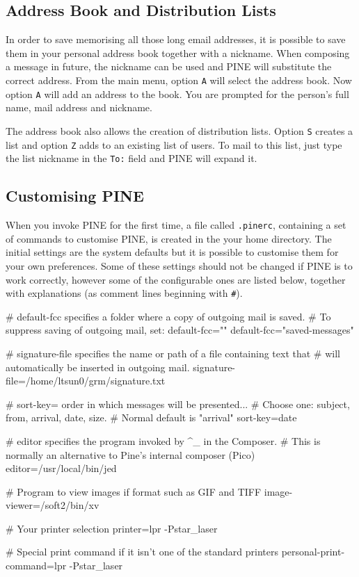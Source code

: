 \documentclass[11pt,nolof]{starlink}
\begin{document}
\subsection{Address Book and Distribution Lists}

In order to save memorising all those long email addresses, it is
possible to save them in your personal address book together with a
nickname.  When composing a message in future, the nickname can be used
and PINE will substitute the correct address. From the main menu,
option \texttt{A} will select the address book. Now option \texttt{A} will
add an address to the book. You are prompted for the person's full
name, mail address and nickname.

The address book also allows the creation of distribution lists.
Option \texttt{S} creates a list and option \texttt{Z} adds to an existing
list of users. To mail to this list, just type the list nickname in the
\texttt{To:} field and PINE will expand it.

\subsection{Customising PINE}
\label{sec-cust}

When you invoke PINE for the first time, a file called \texttt{.pinerc},
containing a set of commands to customise PINE, is created in the your
home directory. The initial settings are the system defaults but it is
possible to customise them for your own preferences.  Some of these
settings should not be changed if PINE is to work correctly, however
some of the configurable ones are listed below, together with
explanations (as comment lines beginning with \texttt{\#}).

\begin{small}
\begin{terminalv}
# default-fcc specifies a folder where a copy of outgoing mail is saved.
# To suppress saving of outgoing mail, set: default-fcc=""
default-fcc="saved-messages"

# signature-file specifies the name or path of a file containing text that
# will automatically be inserted in outgoing mail.
signature-file=/home/ltsun0/grm/signature.txt

# sort-key= order in which messages will be presented...
# Choose one: subject, from, arrival, date, size.
# Normal default is "arrival"
sort-key=date

# editor specifies the program invoked by ^_ in the Composer.
# This is normally an alternative to Pine's internal composer (Pico)
editor=/usr/local/bin/jed

# Program to view images if format such as GIF and TIFF
image-viewer=/soft2/bin/xv

# Your printer selection
printer=lpr -Pstar_laser

# Special print command if it isn't one of the standard printers
personal-print-command=lpr -Pstar_laser
\end{terminalv}
\end{small}
\end{document}
